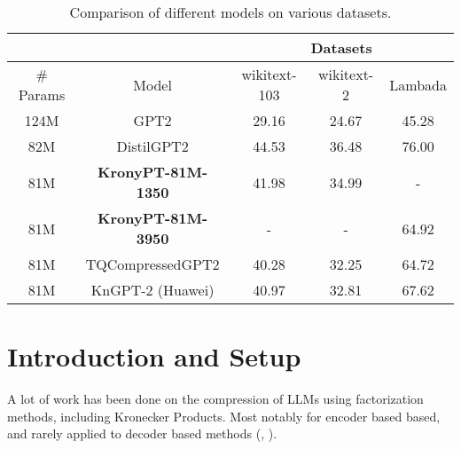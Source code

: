 \documentclass{article}
\begin{document}
\begin{table}[h]
\centering
\begin{tabular}{|c|c|c|c|c|}
\hline
 & & \multicolumn{3}{c|}{Datasets} \\ \hline
\# Params &  Model            & wikitext-103 & wikitext-2 & Lambada \\ \hline
124M      & GPT2              & 29.16        & 24.67      & 45.28      \\ \hline
82M       & DistilGPT2        & 44.53        & 36.48      & 76.00      \\ \hline
81M       & \textbf{KronyPT-81M-1350}  & 41.98        & 34.99      & -          \\ \hline
81M       & \textbf{KronyPT-81M-3950}  & -            & -          & 64.92      \\ \hline
81M       & TQCompressedGPT2  & 40.28        & 32.25      & 64.72      \\ \hline
81M       & KnGPT-2 (Huawei)  & 40.97        & 32.81      & 67.62      \\ \hline
\end{tabular}
\caption{Comparison of different models on various datasets.}
\end{table}



\section{Introduction and Setup}
\label{sec:Introduction and Setup}


A lot of work has been done on the compression of LLMs using factorization methods, including Kronecker Products. Most notably for encoder based based, and rarely applied to decoder based methods (\cite{tahaei2022kroneckerbert}, \cite{edalati2021kroneckr}).
\end{document}
